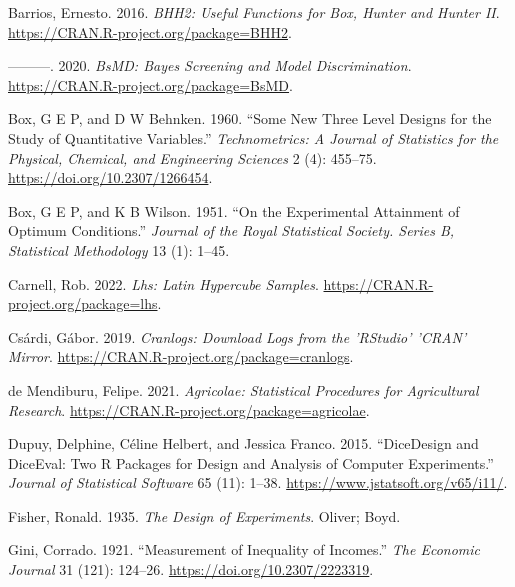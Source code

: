 \hypertarget{refs}{}
\begin{CSLReferences}{1}{0}
\leavevmode{}%
Barrios, Ernesto. 2016. \emph{BHH2: Useful Functions for Box, Hunter and Hunter II}. \url{https://CRAN.R-project.org/package=BHH2}.

\leavevmode{}%
---------. 2020. \emph{BsMD: Bayes Screening and Model Discrimination}. \url{https://CRAN.R-project.org/package=BsMD}.

\leavevmode{}%
Box, G E P, and D W Behnken. 1960. {``Some New Three Level Designs for the Study of Quantitative Variables.''} \emph{Technometrics: A Journal of Statistics for the Physical, Chemical, and Engineering Sciences} 2 (4): 455--75. \url{https://doi.org/10.2307/1266454}.

\leavevmode{}%
Box, G E P, and K B Wilson. 1951. {``On the Experimental Attainment of Optimum Conditions.''} \emph{Journal of the Royal Statistical Society. Series B, Statistical Methodology} 13 (1): 1--45.

\leavevmode{}%
Carnell, Rob. 2022. \emph{Lhs: Latin Hypercube Samples}. \url{https://CRAN.R-project.org/package=lhs}.

\leavevmode{}%
Csárdi, Gábor. 2019. \emph{Cranlogs: Download Logs from the 'RStudio' 'CRAN' Mirror}. \url{https://CRAN.R-project.org/package=cranlogs}.

\leavevmode{}%
de Mendiburu, Felipe. 2021. \emph{Agricolae: Statistical Procedures for Agricultural Research}. \url{https://CRAN.R-project.org/package=agricolae}.

\leavevmode{}%
Dupuy, Delphine, Céline Helbert, and Jessica Franco. 2015. {``{DiceDesign} and {DiceEval}: Two {R} Packages for Design and Analysis of Computer Experiments.''} \emph{Journal of Statistical Software} 65 (11): 1--38. \url{https://www.jstatsoft.org/v65/i11/}.

\leavevmode{}%
Fisher, Ronald. 1935. \emph{The Design of Experiments}. Oliver; Boyd.

\leavevmode{}%
Gini, Corrado. 1921. {``Measurement of Inequality of Incomes.''} \emph{The Economic Journal} 31 (121): 124--26. \url{https://doi.org/10.2307/2223319}.


\end{CSLReferences}
